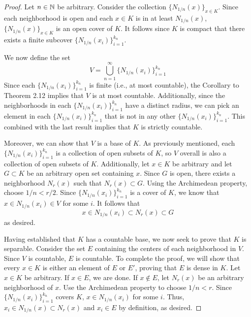 \documentclass[../psets.tex]{subfiles}
\begin{document}
\begin{enumerate}[label={\textbf{\arabic*.}}]
\begin{proof}
        Let $n\in\mathbb{N}$ be arbitrary. Consider the collection $\{N_{1/n}(x)\}_{x\in K}$. Since each neighborhood is open and each $x\in K$ is in at least $N_{1/n}(x)$, $\{N_{1/n}(x)\}_{x\in K}$ is an open cover of $K$. It follows since $K$ is compact that there exists a finite subcover $\{N_{1/n}(x_i)\}_{i=1}^{k_n}$.\par
        We now define the set
        \begin{equation*}
            V = \bigcup_{n=1}^\infty\{N_{1/n}(x_i)\}_{i=1}^{k_n}
        \end{equation*}
        Since each $\{N_{1/n}(x_i)\}_{i=1}^{k_n}$ is finite (i.e., at most countable), the Corollary to Theorem 2.12 implies that $V$ is at most countable. Additionally, since the neighborhoods in each $\{N_{1/n}(x_i)\}_{i=1}^{k_n}$ have a distinct radius, we can pick an element in each $\{N_{1/n}(x_i)\}_{i=1}^{k_n}$ that is not in any other $\{N_{1/n}(x_i)\}_{i=1}^{k_n}$. This combined with the last result implies that $K$ is strictly countable.\par
        Moreover, we can show that $V$ is a base of $K$. As previously mentioned, each $\{N_{1/n}(x_i)\}_{i=1}^{k_n}$ is a collection of open subsets of $K$, so $V$ overall is also a collection of open subsets of $K$. Additionally, let $x\in K$ be arbitrary and let $G\subset K$ be an arbitrary open set containing $x$. Since $G$ is open, there exists a neighborhood $N_r(x)$ such that $N_r(x)\subset G$. Using the Archimedean property, choose $1/n<r/2$. Since $\{N_{1/n}(x_i)\}_{i=1}^{k_n}$ is a cover of $K$, we know that $x\in N_{1/n}(x_i)\in V$ for some $i$. It follows that
        \begin{equation*}
            x \in N_{1/n}(x_i)
            \subset N_r(x)
            \subset G
        \end{equation*}
        as desired.\par
        Having established that $K$ has a countable base, we now seek to prove that $K$ is separable. Consider the set $E$ containing the centers of each neighborhood in $V$. Since $V$ is countable, $E$ is countable. To complete the proof, we will show that every $x\in K$ is either an element of $E$ or $E'$, proving that $E$ is dense in $K$. Let $x\in K$ be arbitrary. If $x\in E$, we are done. If $x\notin E$, let $N_r(x)$ be an arbitrary neighborhood of $x$. Use the Archimedean property to choose $1/n<r$. Since $\{N_{1/n}(x_i)\}_{i=1}^{k_n}$ covers $K$, $x\in N_{1/n}(x_i)$ for some $i$. Thus, $x_i\in N_{1/n}(x)\subset N_r(x)$ and $x_i\in E$ by definition, as desired.

\end{proof}
\end{enumerate}
\end{document}
